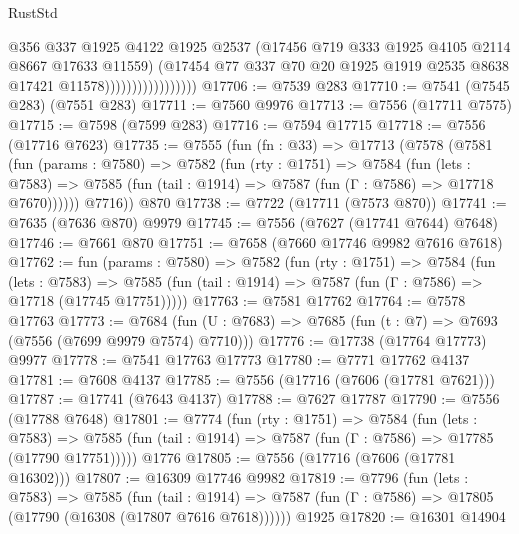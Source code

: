 \begin{lexlean}{RustStd}
\begin{coremodule}
                                    @356
                                    @337
                                    @1925
                                    @4122
                                    @1925
                                    @2537
                                    (@17456 @719 @333 @1925 @4105 @2114 @8667 @17633 @11559)
                                    (@17454
                                      @77
                                      @337
                                      @70
                                      @20
                                      @1925
                                      @1919
                                      @2535
                                      @8638
                                      @17421
                                      @11578)))))))))))))))))
@17706 := @7539 @283
@17710 := @7541 (@7545 @283) (@7551 @283)
@17711 := @7560 @9976
@17713 := @7556 (@17711 @7575)
@17715 := @7598 (@7599 @283)
@17716 := @7594 @17715
@17718 := @7556 (@17716 @7623)
@17735 := @7555
    (fun (fn : @33) =>
    @17713
      (@7578
        (@7581
          (fun (params : @7580) =>
          @7582
            (fun (rty : @1751) =>
            @7584
              (fun (lets : @7583) =>
              @7585 (fun (tail : @1914) => @7587 (fun (Γ : @7586) => @17718 @7670))))))
        @7716))
    @870
@17738 := @7722 (@17711 (@7573 @870))
@17741 := @7635 (@7636 @870) @9979
@17745 := @7556 (@7627 (@17741 @7644) @7648)
@17746 := @7661 @870
@17751 := @7658 (@7660 @17746 @9982 @7616 @7618)
@17762 := fun (params : @7580) =>
  @7582
    (fun (rty : @1751) =>
    @7584
      (fun (lets : @7583) =>
      @7585 (fun (tail : @1914) => @7587 (fun (Γ : @7586) => @17718 (@17745 @17751)))))
@17763 := @7581 @17762
@17764 := @7578 @17763
@17773 := @7684 (fun (U : @7683) => @7685 (fun (t : @7) => @7693 (@7556 (@7699 @9979 @7574) @7710)))
@17776 := @17738 (@17764 @17773) @9977
@17778 := @7541 @17763 @17773
@17780 := @7771 @17762 @4137
@17781 := @7608 @4137
@17785 := @7556 (@17716 (@7606 (@17781 @7621)))
@17787 := @17741 (@7643 @4137)
@17788 := @7627 @17787
@17790 := @7556 (@17788 @7648)
@17801 := @7774
    (fun (rty : @1751) =>
    @7584
      (fun (lets : @7583) =>
      @7585 (fun (tail : @1914) => @7587 (fun (Γ : @7586) => @17785 (@17790 @17751)))))
    @1776
@17805 := @7556 (@17716 (@7606 (@17781 @16302)))
@17807 := @16309 @17746 @9982
@17819 := @7796
    (fun (lets : @7583) =>
    @7585
      (fun (tail : @1914) =>
      @7587 (fun (Γ : @7586) => @17805 (@17790 (@16308 (@17807 @7616 @7618))))))
    @1925
@17820 := @16301 @14904

\end{coremodule}
\end{lexlean}
